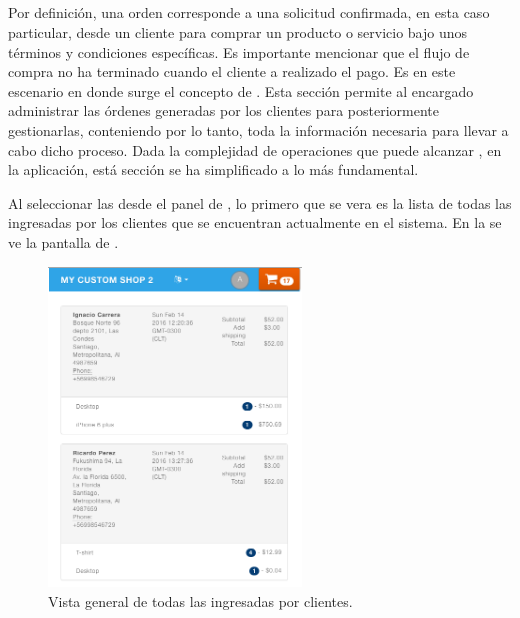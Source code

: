 \subsection{\ordersEF}

	Por definición, una orden corresponde a una solicitud confirmada, en esta caso particular, desde un cliente para comprar un producto o servicio bajo unos términos y condiciones específicas. Es importante mencionar que el flujo de compra no ha terminado cuando el cliente a realizado el pago. Es en este escenario en donde surge el concepto de \orderFulfillmentCOM.
	Esta sección permite al encargado administrar las órdenes generadas por los clientes para posteriormente gestionarlas, conteniendo por lo tanto, toda la información necesaria para llevar a cabo dicho proceso.
	Dada la complejidad de operaciones que puede alcanzar \orderFulfillmentCOM, en la aplicación, está sección se ha simplificado a lo más fundamental.

	Al seleccionar las \ordersEF desde el panel de \dashboardEF, lo primero que se vera es la lista de todas las \ordersEF ingresadas por los clientes que se encuentran actualmente en el sistema. En la  se ve la pantalla de \ordersEF.


	\begin{figure}[h!]
		\centering
		\includegraphics[width=0.6\textwidth]{figuras/orders/grid/main.png}
		\caption{Vista general de todas las \ordersEF ingresadas por clientes.}
		\label{figure:dashboard:orders:grid}
	\end{figure}

